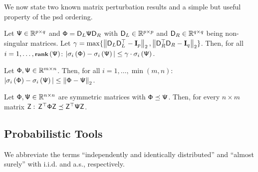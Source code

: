 %
We now state two known matrix perturbation results and a simple but useful property of the psd ordering.
\begin{lemma}\label{lem:pert1}
Let ${\mathsf{\Psi} } \in \mathbb{R}^{p \times q}$ and $ {\mathsf{\Phi} } =  {\mathsf{D} }_L {\mathsf{\Psi} } {\mathsf{D} }_R $ with ${\mathsf{D} }_L \in \mathbb{R}^{p \times p}$ and ${\mathsf{D} }_R \in \mathbb{R}^{q \times q}$ being non-singular matrices.
Let $\gamma = \max\{  \left\| {\mathsf{D} }_L {\mathsf{D} }_L^\top - \mathbf{I}_p \right\|_2,  \left\| {\mathsf{D} }_R^\top {\ensuremath{\mathsf{D} }}_R - \mathbf{I}_q \right\|_2 \} $. Then, for all $i=1,\ldots,\operatorname{\textbf{{\footnotesize rank}}}\left({\mathsf{\Psi} }\right)$:
$  |  \sigma_i\left( {\mathsf{\Phi} } \right) -  \sigma_i\left( {\mathsf{\Psi} } \right)   |  \le \gamma \cdot  \sigma_i\left( {\mathsf{\Psi} } \right). $
\end{lemma}

\begin{lemma}\label{lem:pert2}
Let ${\mathsf{\Phi} }, {\mathsf{\Psi} } \in \mathbb{R}^{m \times n}$. Then, for all $i=1,\ldots, \min( m,n):$
$| \sigma_i\left({\mathsf{\Phi} }\right)- \sigma_i\left({\mathsf{\Psi} }\right)  |  \le \left\|{\mathsf{\Phi} } - {\mathsf{\Psi} }\right\|_2 $.
\end{lemma}
%

%
\begin{lemma}\label{lem:pert3}
Let ${\mathsf{\Phi} }, {\mathsf{\Psi} } \in \mathbb{R}^{n \times n}$ are symmetric matrices with ${\mathsf{\Phi} } \preceq {\ensuremath{\mathsf{\Psi} }}$. Then, for every $n \times m$ matrix ${\mathsf{Z} }:$
${\mathsf{Z} }^\top {\ensuremath{\mathsf{\Phi} }} {\ensuremath{\mathsf{Z} }} \preceq {\ensuremath{\mathsf{Z} }}^\top {\ensuremath{\mathsf{\Psi} }} {\ensuremath{\mathsf{Z} }}$.
\end{lemma}
%
\subsection{Probabilistic Tools}
%
We abbreviate the terms ``independently and identically distributed'' and ``almost surely'' with i.i.d. and a.s., respectively.

